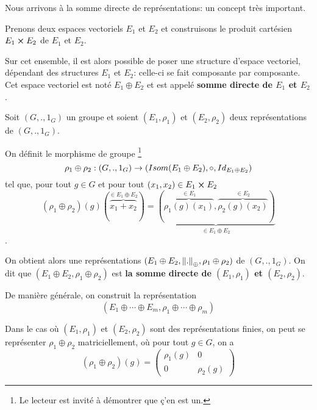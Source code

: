 Nous arrivons à la somme directe de représentations: un concept très important.

Prenons deux espaces vectoriels $E_{1}$ et $E_{2}$ et construisons le produit
cartésien $E_{1} \cross E_{2}$ de $E_{1}$ et $E_{2}$.

Sur cet ensemble, il est alors possible de poser une structure d'espace
vectoriel, dépendant des structures $E_{1}$ et $E_{2}$: celle-ci se fait
composante par composante. Cet espace vectoriel est noté $E_{1} \oplus E_{2}$
et est appelé \textbf{somme directe de $E_{1}$ et $E_{2}$}.

\begin{definition} 
	Soit $(G, ., 1_{G})$ un groupe et soient $(E_{1}, \rho_{1})$
	et $(E_{2}, \rho_{2})$
	deux représentations de $(G, ., 1_{G})$.

	On définit le morphisme de groupe \footnote{Le lecteur est invité à
	démontrer que ç'en est un.}
	\begin{equation}
		\rho_{1} \oplus \rho_{2} : (G, ., 1_{G}) \rightarrow (Isom(E_{1}
		\oplus E_{2}), \circ, Id_{E_{1} \oplus E_{2}})
	\end{equation}
	tel que, pour tout $g \in G$ et pour tout $(x_{1}, x_{2}) \in E_{1} \cross
	E_{2}$
	\begin{equation}
		(\rho_{1} \oplus \rho_{2})(g)(\overbrace{x_{1} + x_{2}}^{\in E_{1} \oplus E_{2}}) =
		\underbrace{(\overbrace{\rho_{1}(g) (x_{1})}^{\in E_{1}},
		\overbrace{\rho_{2}(g)(x_{2})}^{\in E_{2}})}_{\in E_{1} \oplus E_{2}}
	\end{equation}.

	On obtient alors une représentations $(E_{1} \oplus E_{2},
	\norm{.}_{\oplus}, \rho_{1} \oplus
	\rho_{2})$ de $(G, ., 1_{G})$. On dit que $(E_{1} \oplus E_{2}, \rho_{1} \oplus \rho_{2})$ est \textbf{la somme
		directe de $(E_{1}, \rho_{1})$ et $(E_{2},
		\rho_{2})$}.

	De manière générale, on construit la représentation
	\begin{equation}
		(E_{1} \oplus \cdots \oplus E_{m}, \rho_{1} \oplus \cdots \oplus \rho_{m})
	\end{equation}
\end{definition}

Dans le cas où $(E_{1}, \rho_{1})$ et $(E_{2}, \rho_{2})$ sont des
représentations finies, on peut se représenter $\rho_{1} \oplus \rho_{2}$
matriciellement, où pour tout $g \in G$, on a
\begin{equation}
	(\rho_{1} \oplus \rho_{2})(g) =
	\begin{pmatrix}
		\rho_{1}(g)	& 0 \\
		0			& \rho_{2}(g)
	\end{pmatrix}
\end{equation}

